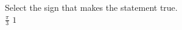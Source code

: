 \documentclass{ximera}
\author{David Kish}
\begin{document}
\begin{exercise}
Select the sign that makes the statement true.\\
$\frac{\pi}{3}$ \wordChoice{\choice{$<$}\choice[correct]{$>$}\choice{$=$}} $1$ 

\end{exercise}
\end{document}

